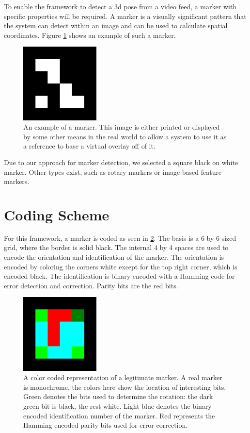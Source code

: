 \label{section_markers}

To enable the framework to detect a 3d pose from a video feed, a marker with specific properties will be required.
A marker is a visually significant pattern that the system can detect within an image and can be used to calculate spatial coordinates.
Figure \ref{fig:marker_example} shows an example of such a marker.

\begin{figure}
	\centering
	\includegraphics[width=4cm]{img/marker_example.png}
	\caption[Example Marker.]{An example of a marker. This image is either printed or displayed by some other means in the real world to allow a system to use it as a reference to base a virtual overlay off of it.}
	\label{fig:marker_example}
\end{figure}

Due to our approach for marker detection, we selected a square black on white marker.
Other types exist, such as rotary markers or image-based feature markers.

\section{Coding Scheme}

For this framework, a marker is coded as seen in \ref{fig:marker_template}.
The basis is a 6 by 6 sized grid, where the border is solid black.
The internal 4 by 4 spaces are used to encode the orientation and identification of the marker.
The orientation is encoded by coloring the corners white except for the top right corner, which is encoded black.
The identification is binary encoded with a Hamming code\cite{hamming} for error detection and correction.
Parity bits are the red bits.

\begin{figure}
	\centering
	\includegraphics[width=4cm]{img/marker_template.png}
	\caption[Template Marker.]{A color coded representation of a legitimate marker. A real marker is monochrome, the colors here show the location of interesting bits. Green denotes the bits used to determine the rotation: the dark green bit is black, the rest white. Light blue denotes the binary encoded identification number of the marker. Red represents the Hamming encoded parity bits used for error correction.}
	\label{fig:marker_template}
\end{figure}


